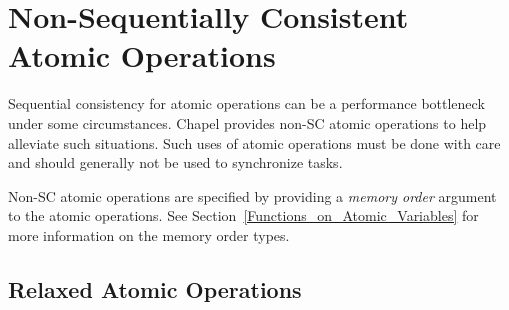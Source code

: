 






\section{Non-Sequentially Consistent Atomic Operations}
\label{non_sc_atomics}

Sequential consistency for atomic operations can be a performance
bottleneck under some circumstances.  Chapel provides non-SC atomic
operations to help alleviate such situations.  Such uses of atomic
operations must be done with care and should generally not be used to
synchronize tasks.

Non-SC atomic operations are specified by providing a \emph{memory
order} argument to the atomic operations.  See
Section~\ref{Functions_on_Atomic_Variables} for more information on
the memory order types.

\subsection{Relaxed Atomic Operations}
\label{relaxed_atomics}


